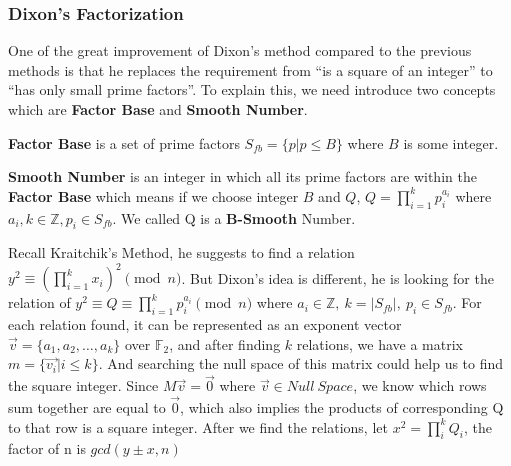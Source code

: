 \documentclass[12pt]{article} %
\begin{document}
\subsubsection {Dixon's Factorization}
One of the great improvement of Dixon's method compared to the previous methods is that he replaces the requirement from ``is a square of an integer'' to ``has only small prime factors''. To explain this, we need introduce two concepts which are \textbf{Factor Base} and \textbf{Smooth Number}.

\textbf{Factor Base} is a set of prime factors $S_{fb}=\{p | p \le B\}$ where $B$ is some integer.

\textbf{Smooth Number} is an integer in which all its prime factors are within the \textbf{Factor Base} which means if we choose integer $B$ and $Q$, $Q = \prod_{i=1}^k{p_i^{a_i}}$ where $a_i, k \in \mathbb{Z}, p_i \in S_{fb}$. We called Q is a \textbf{B-Smooth} Number.

Recall Kraitchik's Method, he suggests to find a relation $y^2 \equiv \left (\prod_{i=1}^k{x_i}\right)^2 \pmod{n}$. But Dixon's idea is different, he is looking for the relation of $\displaystyle y^2 \equiv Q \equiv \prod_{i=1}^k{p_i^{a_i}} \pmod{n}$ where $a_i \in \mathbb{Z},\ k=|S_{fb}|,\ p_i \in S_{fb}$. For each relation  found, it can be represented as an exponent vector $\vec{v} = \{a_1, a_2, \dots, a_k\}$ over $\mathbb{F}_{2}$, and after finding $k$ relations, we have a matrix $m = \{\vec{v_i} | i \le k\}$. And searching the null space of this matrix could help us to find the square integer. Since $M\vec{v} = \vec{0}$ where $\vec{v} \in Null\ Space$, we know which rows sum together are equal to $\vec{0}$, which also implies the products of corresponding Q to that row is a square integer. After we find the relations, let $x^2 = \prod_i^k{Q_i}$, the factor of n is $gcd(y\pm x, n)$
\end{document}

